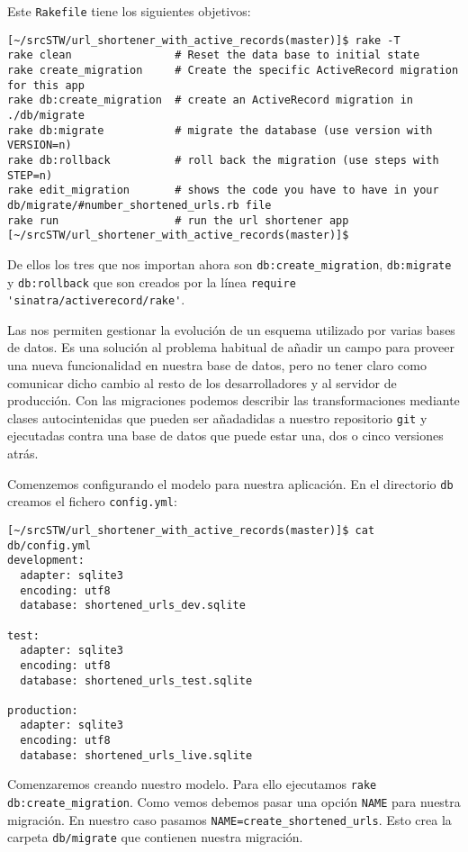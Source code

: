 Este \verb|Rakefile| tiene los siguientes objetivos:
\begin{verbatim}
[~/srcSTW/url_shortener_with_active_records(master)]$ rake -T
rake clean                # Reset the data base to initial state
rake create_migration     # Create the specific ActiveRecord migration for this app
rake db:create_migration  # create an ActiveRecord migration in ./db/migrate
rake db:migrate           # migrate the database (use version with VERSION=n)
rake db:rollback          # roll back the migration (use steps with STEP=n)
rake edit_migration       # shows the code you have to have in your db/migrate/#number_shortened_urls.rb file
rake run                  # run the url shortener app
[~/srcSTW/url_shortener_with_active_records(master)]$ 

\end{verbatim}
De ellos los tres que nos importan ahora son \verb|db:create_migration|, \verb|db:migrate| y \verb|db:rollback| 
que son creados por la línea \verb|require 'sinatra/activerecord/rake'|.

Las  
nos permiten gestionar la evolución de un esquema utilizado por varias bases de datos.
Es una solución al problema habitual de añadir un campo para proveer una nueva funcionalidad en nuestra 
base de datos, pero no tener claro como comunicar dicho cambio al resto de los desarrolladores
y al servidor de producción.
Con las migraciones podemos describir las transformaciones mediante clases autocintenidas que pueden
ser añadadidas a nuestro repositorio \verb|git| y ejecutadas contra una base de datos que puede estar una, dos 
o cinco versiones atrás.


Comenzemos configurando el modelo para nuestra aplicación. En el directorio \verb|db| 
creamos el fichero \verb|config.yml|:
\begin{verbatim}
[~/srcSTW/url_shortener_with_active_records(master)]$ cat db/config.yml 
development:
  adapter: sqlite3
  encoding: utf8
  database: shortened_urls_dev.sqlite

test:
  adapter: sqlite3
  encoding: utf8
  database: shortened_urls_test.sqlite

production:
  adapter: sqlite3
  encoding: utf8
  database: shortened_urls_live.sqlite
\end{verbatim}

Comenzaremos creando nuestro modelo.
Para ello ejecutamos \verb|rake db:create_migration|.
Como vemos debemos pasar una opción \verb|NAME| para nuestra migración. En nuestro caso pasamos 
\verb|NAME=create_shortened_urls|.
Esto crea la carpeta \verb|db/migrate| que contienen nuestra migración.

